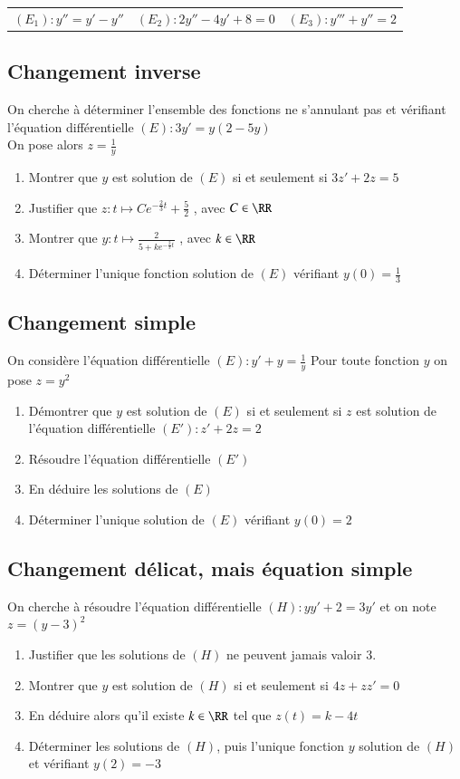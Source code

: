 \documentclass[oneside,12pt]{article}          %
\begin{document}
\begin{tabular}{p{} p{} p{}}
    $(E_1):y''=y'-y''$ & $(E_2):2y''-4y'+8=0$ & $(E_3):y'''+y''=2$ \\
\end{tabular}



\subsection{Changement inverse}
On cherche à déterminer l'ensemble des fonctions ne s'annulant pas et vérifiant l'équation différentielle
$(E):3y'=y(2-5y)$  \\
On pose alors $z=\frac{1}{y}$
\begin{enumerate}
	\item Montrer que $y$ est solution de $(E)$ si et seulement si $3z'+2z=5$
	\item Justifier que $z:t\mapsto Ce^{-\frac{2}{3}t}+\frac{5}{2}$ , avec $C\in\RR$
	\item Montrer que $y:t\mapsto\frac{2}{5+ke^{-\frac{2}{3}t}}$ , avec $k\in\RR$
	\item Déterminer l'unique fonction solution de $(E)$ vérifiant $y(0)=\frac{1}{3}$
\end{enumerate}


\subsection{Changement simple}
On considère l'équation différentielle $(E):y'+y=\frac{1}{y}$
Pour toute fonction $y$ on pose $z=y^2$
\begin{enumerate}
    \item Démontrer que $y$ est solution de $(E)$ si et seulement si $z$ est solution de l'équation différentielle $(E'):z'+2z=2$
    \item Résoudre l'équation différentielle $(E')$
    \item En déduire les solutions de $(E)$
    \item Déterminer l'unique solution de $(E)$ vérifiant $y(0)=2$
\end{enumerate}



\subsection{Changement délicat, mais équation simple}
On cherche à résoudre l'équation différentielle $(H):yy'+2=3y'$ et on note $z=(y-3)^2$
\begin{enumerate}
    \item Justifier que les solutions de $(H)$ ne peuvent jamais valoir 3.
    \item Montrer que $y$ est solution de $(H)$ si et seulement si $4z+zz'=0$
    \item En déduire alors qu'il existe $k\in\RR$ tel que $z(t)=k-4t$
    \item Déterminer les solutions de $(H)$, puis l'unique fonction $y$ solution de $(H)$ et vérifiant $y(2)=-3$
\end{enumerate}
\end{document}
